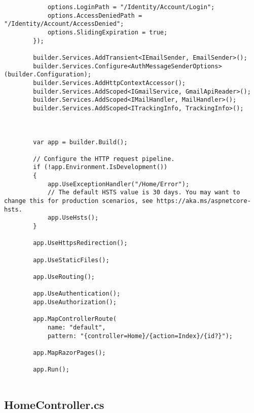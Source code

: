 \begin{verbatim}
            options.LoginPath = "/Identity/Account/Login";
            options.AccessDeniedPath = "/Identity/Account/AccessDenied";
            options.SlidingExpiration = true;
        });
        
        builder.Services.AddTransient<IEmailSender, EmailSender>();
        builder.Services.Configure<AuthMessageSenderOptions>(builder.Configuration);
        builder.Services.AddHttpContextAccessor();
        builder.Services.AddScoped<IGmailService, GmailApiReader>();
        builder.Services.AddScoped<IMailHandler, MailHandler>();
        builder.Services.AddScoped<ITrackingInfo, TrackingInfo>();
        
        
        
        var app = builder.Build();
        
        // Configure the HTTP request pipeline.
        if (!app.Environment.IsDevelopment())
        {
            app.UseExceptionHandler("/Home/Error");
            // The default HSTS value is 30 days. You may want to change this for production scenarios, see https://aka.ms/aspnetcore-hsts.
            app.UseHsts();
        }
        
        app.UseHttpsRedirection();
        
        app.UseStaticFiles();
        
        app.UseRouting();
        
        app.UseAuthentication();
        app.UseAuthorization();
        
        app.MapControllerRoute(
            name: "default",
            pattern: "{controller=Home}/{action=Index}/{id?}");
        
        app.MapRazorPages();
        
        app.Run();
        
\end{verbatim}

\subsection{HomeController.cs}

